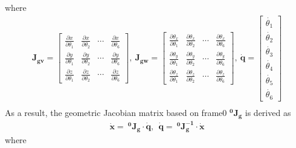 where
\begin{equation*}
\begin{split}
\mathbf{J_{gv}} =
\begin{bmatrix}
\frac{\partial x}{\partial \theta _1}	&\frac{\partial x}{\partial \theta _2}	&\cdots		&\frac{\partial x}{\partial \theta _6}\\
\frac{\partial y}{\partial \theta _1}	&\frac{\partial y}{\partial \theta _2}	&\cdots		&\frac{\partial y}{\partial \theta _6}\\
\frac{\partial z}{\partial \theta _1}	&\frac{\partial z}{\partial \theta _2}	&\cdots		&\frac{\partial z}{\partial \theta _6}
\end{bmatrix}
,\ \mathbf{J_{gw}} = 
\begin{bmatrix}
\frac{\partial \theta _x}{\partial \theta _1}	&\frac{\partial \theta _x}{\partial \theta _2}	&\cdots		&\frac{\partial \theta _x}{\partial \theta _6}\\
\frac{\partial \theta _y}{\partial \theta _1}	&\frac{\partial \theta _y}{\partial \theta _2}	&\cdots		&\frac{\partial \theta _y}{\partial \theta _6}\\
\frac{\partial \theta _z}{\partial \theta _1}	&\frac{\partial \theta _z}{\partial \theta _2}	&\cdots		&\frac{\partial \theta _z}{\partial \theta _6}
\end{bmatrix} 
,\ \boldsymbol{\dot{q}}
=
\begin{bmatrix}
\dot{\theta _1} \\ 
\dot{\theta _2} \\ 
\dot{\theta _3} \\ 
\dot{\theta _4} \\ 
\dot{\theta _5} \\ 
\dot{\theta _6} 
\end{bmatrix}\\
\end{split}
\end{equation*}
As a result, the geometric Jacobian matrix based on frame{0} $\mathbf{^0J_g}$ is derived as
\begin{equation}
\label{eq:jg0}
\begin{split}
\boldsymbol{\dot{x}} = \ \mathbf{^0\!J_g} \cdot \boldsymbol{\dot{q}}
,\ \ 
\boldsymbol{\dot{q}} = \ \mathbf{^0\!J_g^{-1}} \cdot \boldsymbol{\dot{x}}
\end{split}
\end{equation}
where
